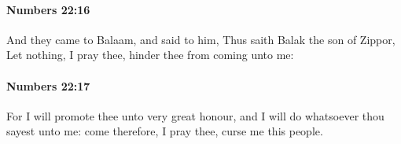 		\paragraph{Numbers 22:16} %
			\label{NUMBERS-22-16}

			And they came to Balaam, and said to him, Thus saith Balak the son of Zippor, Let nothing, I pray thee, hinder thee from coming unto me:


		\paragraph{Numbers 22:17} %
			\label{NUMBERS-22-17}

			For I will promote thee unto very great honour, and I will do whatsoever thou sayest unto me: come therefore, I pray thee, curse me this people.


